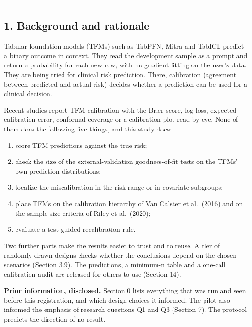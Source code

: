 \documentclass[
  10pt,
]{article}
\providecommand{\tightlist}{%
  \setlength{\itemsep}{0pt}\setlength{\parskip}{0pt}}
\begin{document}
\begin{center}\rule{0.5\linewidth}{0.5pt}\end{center}

\subsection{1. Background and
rationale}\label{background-and-rationale}

Tabular foundation models (TFMs) such as TabPFN, Mitra and
TabICL predict a binary outcome in context. They read the
development sample as a prompt and return a probability for
each new row, with no gradient fitting on the user's data.
They are being tried for clinical risk prediction. There,
calibration (agreement between predicted and actual risk)
decides whether a prediction can be used for a clinical
decision.

Recent studies report TFM calibration with the Brier score,
log-loss, expected calibration error, conformal coverage or
a calibration plot read by eye. None of them does the
following five things, and this study does:

\begin{enumerate}
\def\labelenumi{\arabic{enumi}.}
\tightlist
\item
  score TFM predictions against the true risk;
\item
  check the size of the external-validation goodness-of-fit
  tests on the TFMs' own prediction distributions;
\item
  localize the miscalibration in the risk range or in
  covariate subgroups;
\item
  place TFMs on the calibration hierarchy of Van Calster et
  al.~(2016) and on the sample-size criteria of Riley et
  al.~(2020);
\item
  evaluate a test-guided recalibration rule.
\end{enumerate}

Two further parts make the results easier to trust and to
reuse. A tier of randomly drawn designs checks whether the
conclusions depend on the chosen scenarios (Section 3.9).
The predictions, a minimum-n table and a one-call
calibration audit are released for others to use (Section
14).

\textbf{Prior information, disclosed.} Section 0 lists
everything that was run and seen before this registration,
and which design choices it informed. The pilot also
informed the emphasis of research questions Q1 and Q3
(Section 7). The protocol predicts the direction of no
result.
\end{document}
